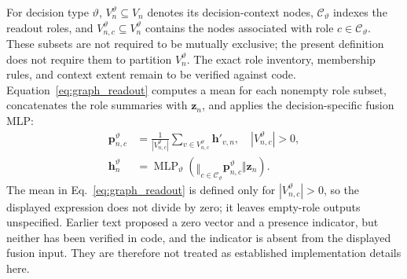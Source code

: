 
For decision type $\vartheta$, $V_n^{\vartheta}\subseteq V_n$ denotes its decision-context
nodes, $\mathcal C_{\vartheta}$ indexes the readout roles, and
$V_{n,c}^{\vartheta}\subseteq V_n^{\vartheta}$ contains the nodes associated with role
$c\in\mathcal C_{\vartheta}$. These subsets are not required to be mutually exclusive;
the present definition does not require them to partition $V_n^{\vartheta}$.
The exact role inventory, membership rules, and context extent remain to be verified against code.
Equation~\eqref{eq:graph_readout} computes a mean for each nonempty role subset, concatenates
the role summaries with $\boldsymbol z_n$, and applies the decision-specific fusion MLP:
\begin{equation}
 \begin{aligned}
 \boldsymbol{p}_{n,c}^{\vartheta}
 &=\frac{1}{|V_{n,c}^{\vartheta}|}
 \sum_{v\in V_{n,c}^{\vartheta}}\boldsymbol{h}'_{v,n},
 \quad |V_{n,c}^{\vartheta}|>0, \\
 \boldsymbol{h}_n^{\vartheta}
 &=\operatorname{MLP}_{\vartheta}\!\left(
 \mathop{\Vert}_{c\in\mathcal C_{\vartheta}}\boldsymbol{p}_{n,c}^{\vartheta}
 \Vert\boldsymbol{z}_n\right).
 \end{aligned}
 \label{eq:graph_readout}
\end{equation}
The mean in Eq.~\eqref{eq:graph_readout} is defined only for
$|V_{n,c}^{\vartheta}|>0$, so the displayed expression does not divide by zero; it leaves
empty-role outputs unspecified. Earlier text proposed a zero vector and a presence indicator,
but neither has been verified in code, and the indicator is absent from the displayed fusion input.
They are therefore not treated as established implementation details here.
